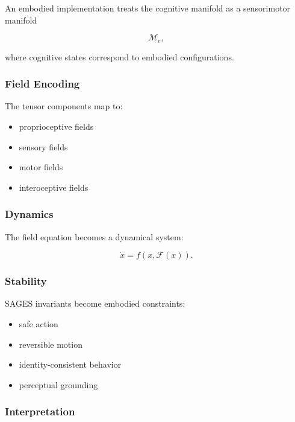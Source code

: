 An embodied implementation treats the cognitive manifold as a sensorimotor manifold

\[
\mathcal{M}_e,
\]

where cognitive states correspond to embodied configurations.

\subsubsection{Field Encoding}\label{field-encoding-2}

The tensor components map to:

\begin{itemize}
\tightlist
\item
  proprioceptive fields\\
\item
  sensory fields\\
\item
  motor fields\\
\item
  interoceptive fields
\end{itemize}

\subsubsection{Dynamics}\label{dynamics-2}

The field equation becomes a dynamical system:

\[
\dot{x} = f(x, \mathcal{F}(x)).
\]

\subsubsection{Stability}\label{stability-3}

SAGES invariants become embodied constraints:

\begin{itemize}
\tightlist
\item
  safe action\\
\item
  reversible motion\\
\item
  identity‑consistent behavior\\
\item
  perceptual grounding
\end{itemize}

\subsubsection{Interpretation}\label{interpretation-3}

